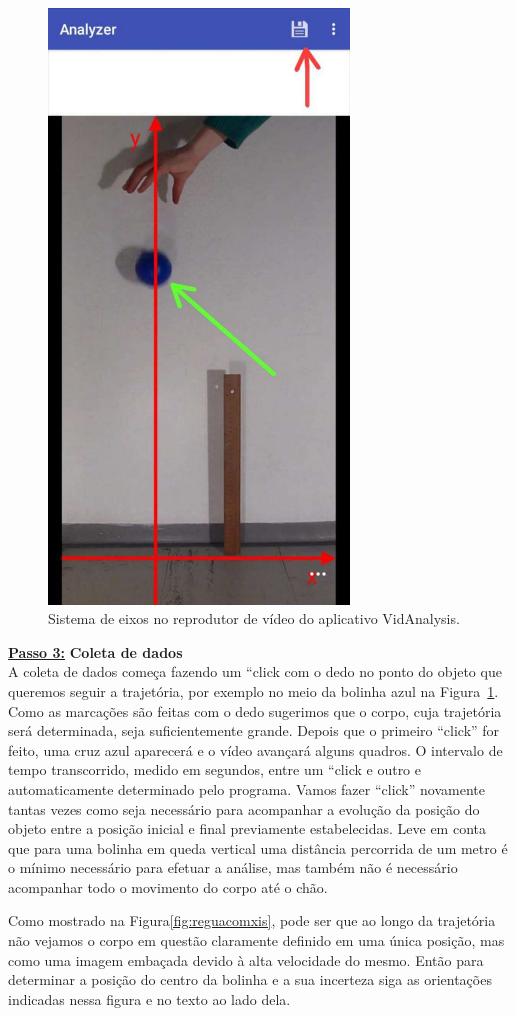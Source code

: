 \begin{figure}[h!]
\centering
\includegraphics[width=8cm]{Figuras_exp3/imagenapendicec4.pdf}
\caption{\label{apendice4c} Sistema de eixos no reprodutor de vídeo do aplicativo VidAnalysis.}
\end{figure}


\underline{\bf Passo 3:} {\bf Coleta de dados}\\


A coleta de dados começa fazendo um ``click com o dedo no ponto do objeto que queremos seguir a trajetória, por exemplo no meio da bolinha azul na Figura~\ref{apendice4c}. Como as marcações são feitas com o dedo sugerimos que o corpo, cuja trajetória será determinada, seja suficientemente grande.
Depois que o primeiro ``click'' for feito, uma cruz azul aparecerá e o vídeo avançará alguns quadros. O intervalo de tempo transcorrido, medido em segundos, entre um ``click e outro e automaticamente determinado pelo programa. Vamos fazer ``click'' novamente tantas vezes como seja necessário para acompanhar a evolução da posição do objeto entre a posição inicial e final previamente estabelecidas. Leve em conta que para uma bolinha em queda vertical uma distância percorrida de um metro é o mínimo necessário para efetuar a análise, mas também não é necessário acompanhar 
todo o movimento do corpo até o chão.
\par 
Como mostrado na  Figura\ref{fig:reguacomxis},  pode ser que ao longo da trajetória não vejamos o corpo em questão claramente definido em uma única posição, mas como uma imagem embaçada devido à alta velocidade do mesmo. Então para determinar a posição do centro da bolinha e a sua incerteza siga as orientações indicadas nessa figura e no texto ao lado dela. 


